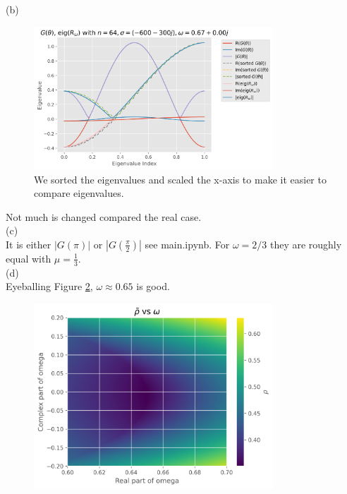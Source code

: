 \documentclass[a4paper,12pt]{article}
\begin{document}
(b) \\
\begin{figure}[h!]
    \centering
    \includegraphics[width=0.8\textwidth]{../code/plts/eigenvalues_1DcomplexG.png}
    \caption{We sorted the eigenvalues and scaled the x-axis to make it easier to compare eigenvalues.}
    \label{fig:eigen complex G 1D}
\end{figure}
Not much is changed compared the real case. \\
(c) \\
It is either $|G(\pi)|$ or $|G(\frac{\pi}{2})|$ 
see main.ipynb. For $\omega = 2/3$ they are roughly equal with $\mu = \frac{1}{3}$.\\
(d) \\
Eyeballing Figure \ref{fig:rho omega 1D complex}, $\omega \approx 0.65$ is good.
\begin{figure}[h!]
    \centering
    \includegraphics[width=0.8\textwidth]{../code/plts/rho_omega_1Dcomplex.png}
    \caption{}
    \label{fig:rho omega 1D complex}
\end{figure}
\end{document}
